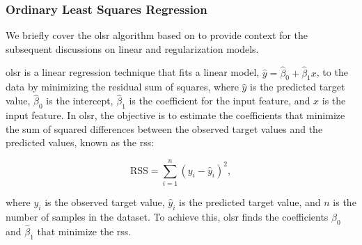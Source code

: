 \subsubsection{Ordinary Least Squares Regression}\label{sec:ols}
We briefly cover the \gls{olsr} algorithm based on \citet{James2023AnIS} to provide context for the subsequent discussions on linear and regularization models.

\gls{olsr} is a linear regression technique that fits a linear model, $\hat{y} = \hat{\beta}_0 + \hat{\beta}_1 x$, to the data by minimizing the residual sum of squares, where $\hat{y}$ is the predicted target value, $\hat{\beta}_0$ is the intercept, $\hat{\beta}_1$ is the coefficient for the input feature, and $x$ is the input feature.
In \gls{olsr}, the objective is to estimate the coefficients that minimize the sum of squared differences between the observed target values and the predicted values, known as the \gls{rss}:

$$
\text{RSS} = \sum_{i=1}^{n} (y_i - \hat{y}_i)^2,
$$

where $y_i$ is the observed target value, $\hat{y}_i$ is the predicted target value, and $n$ is the number of samples in the dataset.
To achieve this, \gls{olsr} finds the coefficients $\hat{\beta}_0$ and $\hat{\beta}_1$ that minimize the \gls{rss}.